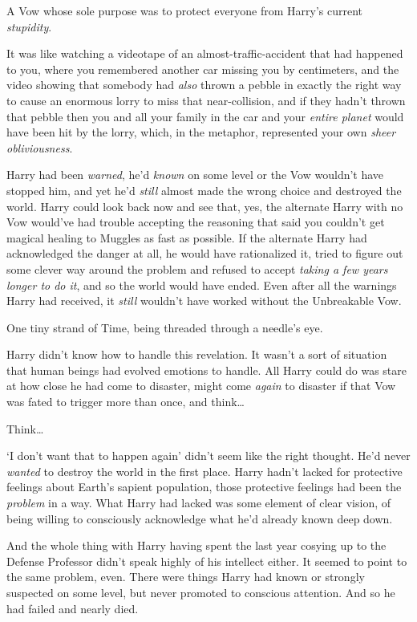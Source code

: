 A Vow whose sole purpose was to protect everyone from Harry's current \emph{stupidity}.

It was like watching a videotape of an almost-traffic-accident that had happened to you, where you remembered another car missing you by centimeters, and the video showing that somebody had \emph{also} thrown a pebble in exactly the right way to cause an enormous lorry to miss that near-collision, and if they hadn't thrown that pebble then you and all your family in the car and your \emph{entire planet} would have been hit by the lorry, which, in the metaphor, represented your own \emph{sheer obliviousness}.

Harry had been \emph{warned}, he'd \emph{known} on some level or the Vow wouldn't have stopped him, and yet he'd \emph{still} almost made the wrong choice and destroyed the world. Harry could look back now and see that, yes, the alternate Harry with no Vow would've had trouble accepting the reasoning that said you couldn't get magical healing to Muggles as fast as possible. If the alternate Harry had acknowledged the danger at all, he would have rationalized it, tried to figure out some clever way around the problem and refused to accept \emph{taking a few years longer to do it}, and so the world would have ended. Even after all the warnings Harry had received, it \emph{still} wouldn't have worked without the Unbreakable Vow.

One tiny strand of Time, being threaded through a needle's eye.

Harry didn't know how to handle this revelation. It wasn't a sort of situation that human beings had evolved emotions to handle. All Harry could do was stare at how close he had come to disaster, might come \emph{again} to disaster if that Vow was fated to trigger more than once, and think{\ldots}

Think{\ldots}

`I don't want that to happen again' didn't seem like the right thought. He'd never \emph{wanted} to destroy the world in the first place. Harry hadn't lacked for protective feelings about Earth's sapient population, those protective feelings had been the \emph{problem} in a way. What Harry had lacked was some element of clear vision, of being willing to consciously acknowledge what he'd already known deep down.

And the whole thing with Harry having spent the last year cosying up to the Defense Professor didn't speak highly of his intellect either. It seemed to point to the same problem, even. There were things Harry had known or strongly suspected on some level, but never promoted to conscious attention. And so he had failed and nearly died.

